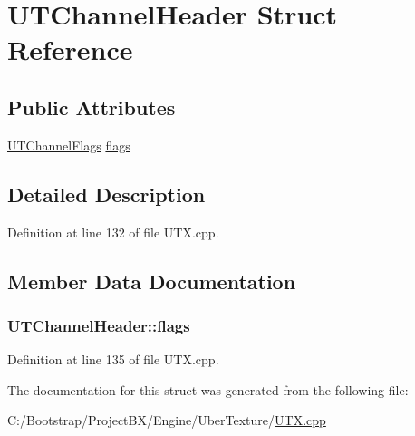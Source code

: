 \hypertarget{struct_u_t_channel_header}{
\section{UTChannelHeader Struct Reference}
\label{struct_u_t_channel_header}
}
\subsection*{Public Attributes}
\begin{CompactItemize}
\item 
\hyperlink{_u_t_x_8h_cffa144f9ef0c71c122e3ff954aee5b1}{UTChannelFlags} \hyperlink{struct_u_t_channel_header_bf57ef4f98688997d02fb4769a4f3da0}{flags}
\end{CompactItemize}


\subsection{Detailed Description}


Definition at line 132 of file UTX.cpp.

\subsection{Member Data Documentation}
\hypertarget{struct_u_t_channel_header_bf57ef4f98688997d02fb4769a4f3da0}{
\subsubsection[{flags}]{ {\bf UTChannelHeader::flags}}}
\label{struct_u_t_channel_header_bf57ef4f98688997d02fb4769a4f3da0}




Definition at line 135 of file UTX.cpp.

The documentation for this struct was generated from the following file:\begin{CompactItemize}
\item 
C:/Bootstrap/ProjectBX/Engine/UberTexture/\hyperlink{_u_t_x_8cpp}{UTX.cpp}\end{CompactItemize}
